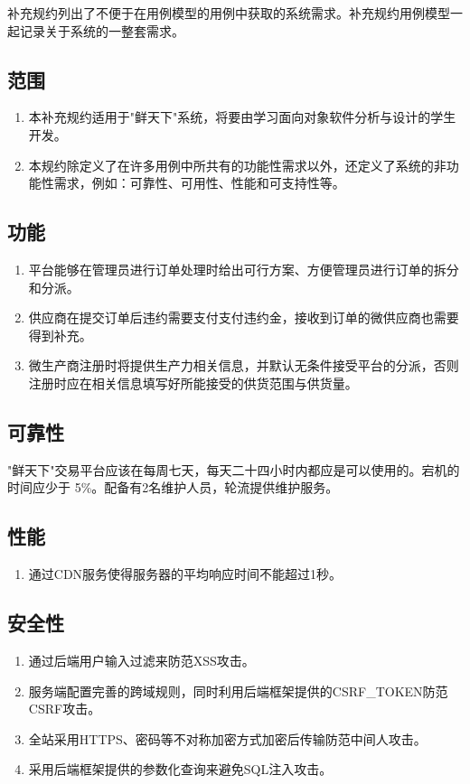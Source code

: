     补充规约列出了不便于在用例模型的用例中获取的系统需求。补充规约用例模型一起记录关于系统的一整套需求。


\subsection{范围}
    \begin{enumerate}

        \item 本补充规约适用于"鲜天下"系统，将要由学习面向对象软件分析与设计的学生开发。
        \item 本规约除定义了在许多用例中所共有的功能性需求以外，还定义了系统的非功能性需求，例如：可靠性、可用性、性能和可支持性等。

    \end{enumerate}

\subsection{功能}
    \begin{enumerate}
        \item 平台能够在管理员进行订单处理时给出可行方案、方便管理员进行订单的拆分和分派。
        \item 供应商在提交订单后违约需要支付支付违约金，接收到订单的微供应商也需要得到补充。
        \item 微生产商注册时将提供生产力相关信息，并默认无条件接受平台的分派，否则注册时应在相关信息填写好所能接受的供货范围与供货量。
    \end{enumerate}


\subsection{可靠性}

    "鲜天下"交易平台应该在每周七天，每天二十四小时内都应是可以使用的。宕机的时间应少于 5\%。配备有2名维护人员，轮流提供维护服务。


\subsection{性能}
    \begin{enumerate}
        \item 通过CDN服务使得服务器的平均响应时间不能超过1秒。
    \end{enumerate}

\subsection{安全性}
    \begin{enumerate}
        \item 通过后端用户输入过滤来防范XSS攻击。
        \item 服务端配置完善的跨域规则，同时利用后端框架提供的CSRF\_TOKEN防范CSRF攻击。
        \item 全站采用HTTPS、密码等不对称加密方式加密后传输防范中间人攻击。
        \item 采用后端框架提供的参数化查询来避免SQL注入攻击。
    \end{enumerate}

